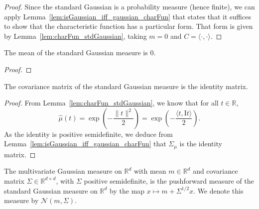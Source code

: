 \begin{proof}  
Since the standard Gaussian is a probability measure (hence finite), we can apply Lemma~\ref{lem:isGaussian_iff_gaussian_charFun} that states that it suffices to show that the characteristic function has a particular form.
That form is given by Lemma~\ref{lem:charFun_stdGaussian}, taking $m=0$ and $C = \langle\cdot, \cdot\rangle$.
\end{proof}


\begin{lemma}\label{lem:integral_id_stdGaussian}
The mean of the standard Gaussian measure is $0$.
\end{lemma}

\begin{proof}  

\end{proof}


\begin{lemma}\label{lem:covMatrix_stdGaussian}
  \leanok
The covariance matrix of the standard Gaussian measure is the identity matrix.
\end{lemma}

\begin{proof}\leanok
From Lemma~\ref{lem:charFun_stdGaussian}, we know that for all $t \in \mathbb{R}$,
$$\hat{\mu}(t) = \exp\left(-\frac{\|t\|^2}{2}\right) = \exp\left(-\frac{\langle t, \mathrm{I}t\rangle}{2}\right).$$
As the identity is positive semidefinite, we deduce from Lemma~\ref{lem:isGaussian_iff_gaussian_charFun} that $\Sigma_\mu$ is the identity matrix.
\end{proof}


\begin{definition}\label{def:multivariateGaussian}
The multivariate Gaussian measure on $\mathbb{R}^d$ with mean $m \in \mathbb{R}^d$ and covariance matrix $\Sigma \in \mathbb{R}^{d \times d}$, with $\Sigma$ positive semidefinite, is the pushforward measure of the standard Gaussian measure on $\mathbb{R}^d$ by the map $x \mapsto m + \Sigma^{1/2} x$.
We denote this measure by $\mathcal{N}(m, \Sigma)$.
\end{definition}


